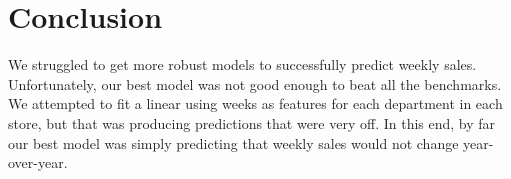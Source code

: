 \documentclass{article}
\begin{document}
\section{Conclusion}

We struggled to get more robust models to successfully predict weekly sales. Unfortunately, our best model was not good enough to beat all the benchmarks. We attempted to fit a linear using weeks as features for each department in each store, but that was producing predictions that were very off. In this end, by far our best model was simply predicting that weekly sales would not change year-over-year. 
\end{document}
